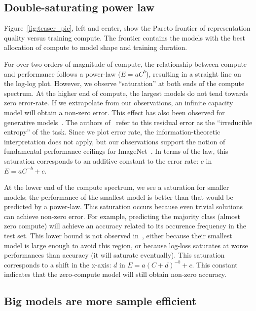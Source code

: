 \subsection{Double-saturating power law}\label{sec:power_laws}

Figure~\ref{fig:teaser_pic}, left and center, show the Pareto frontier of representation quality versus training compute.
The frontier contains the models with the best allocation of compute to model shape and training duration.

For over two orders of magnitude of compute, the relationship between compute and performance follows a power-law ($E=aC^b$), resulting in a straight line on the log-log plot.
However, we observe ``saturation'' at both ends of the compute spectrum.
At the higher end of compute, the largest models do not tend towards zero error-rate.
If we extrapolate from our observations, an infinite capacity model will obtain a non-zero error.
This effect has also been observed for generative models~\cite{henighan2020scaling}.
The authors of~\cite{henighan2020scaling} refer to this residual error as the ``irreducible entropy'' of the task.
Since we plot error rate, the information-theoretic interpretation does not apply, but our observations support the notion of fundamental performance ceilings for ImageNet~\cite{beyer2020imagenet}.
In terms of the law, this saturation corresponds to an additive constant to the error rate: $c$ in $E=aC^{-b}+c$.

At the lower end of the compute spectrum, we see a saturation for smaller models;
the performance of the smallest model is better than that would be predicted by a power-law.
This saturation occurs because even trivial solutions can achieve non-zero error.
For example, predicting the majority class (almost zero compute) will achieve an accuracy related to its occurence frequency in the test set.
This lower bound is not observed in~\cite{henighan2020scaling}, either because their smallest model is large enough to avoid this region, or because log-loss saturates at worse performances than accuracy (it will saturate eventually).
This saturation corresponds to a shift in the x-axis: $d$ in $E=a(C+d)^{-b}+c$.
This constant indicates that the zero-compute model will still obtain non-zero accuracy.



\subsection{Big models are more sample efficient} \label{sec:sample_efficiency}



